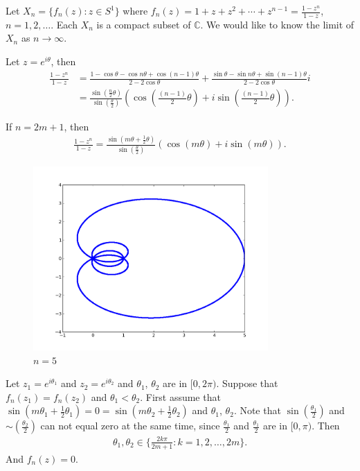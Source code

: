 \documentclass[a4paper,10pt]{amsart}
\newcommand{\C}{\mathbb C} %
\begin{document}
Let $X_{n} = \{f_n(z) : z \in S^{1} \}$ where
$f_n(z) = 1 + z + z^2 + \cdots + z^{n-1} = \frac{1-z^{n}}{1-z}$, 
$n = 1, 2, \ldots$. Each $X_n$ is a compact subset of $\C$. We would like 
to know the limit of $X_n$ as $n \to \infty$.

Let $z = e^{i\theta}$, then
\begin{align*}
    \frac{1-z^{n}}{1-z} &= 
    \frac{1-\cos \theta - \cos n\theta + \cos(n-1)\theta}
    {2-2\cos \theta}
    + \frac{\sin \theta - \sin n\theta + \sin(n-1)\theta}
    {2-2\cos \theta} i \\
    &= \frac{\sin (\frac{n}{2}\theta)}
       {\sin (\frac{\theta}{2})} \left (
       \cos (\frac{(n-1)}{2}\theta) + i\sin (\frac{(n-1)}{2}\theta) \right).
\end{align*}

If $n = 2m + 1$, then
\begin{align*}
    \frac{1-z^{n}}{1-z} = 
    \frac{\sin (m\theta + \frac{1}{2}\theta)}
       {\sin (\frac{\theta}{2})} \left (
       \cos (m\theta) + i\sin (m\theta) \right).
\end{align*}

\begin{figure}
    \centering
    \includegraphics[width=0.8\textwidth]{zn5.png}
    \caption{$n=5$}
\end{figure}

Let $z_1 = e^{i\theta_1}$ and $z_2 = e^{i\theta_2}$ and
$\theta_1$, $\theta_2$ are in $[0, 2\pi)$. Suppose that 
$f_{n}(z_1) = f_{n}(z_2)$ and $\theta_1 < \theta_2$. 
First assume that $\sin (m\theta_1 + \frac{1}{2}\theta_1) = 0
= \sin (m\theta_2 + \frac{1}{2}\theta_2)$ and $\theta_1$, $\theta_2$.
Note that $\sin (\frac{\theta_1}{2})$ and $\sim (\frac{\theta_2}{2})$ can
not equal zero at the same time, since $\frac{\theta_1}{2}$ and 
$\frac{\theta_1}{2}$ are in $[0, \pi)$. Then
\begin{align*}
    \theta_1, \theta_2 \in \{\frac{2k\pi}{2m+1} : k = 1, 2, \ldots, 2m\}. 
\end{align*}
And $f_n(z) = 0$.
\end{document}
